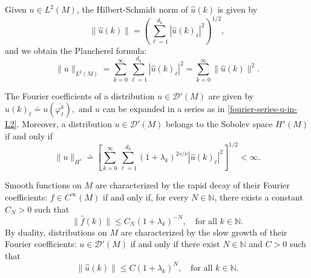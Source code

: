 \documentclass{amsart}
\theoremstyle{definition}
\theoremstyle{remark}
\numberwithin{equation}{section}
\begin{document}
	Given $u \in L^2(M)$, the Hilbert-Schmidt norm of $\widehat{u}(k)$ is given by
	\begin{equation*}
		\|\widehat{u}(k)\|=\left(\sum_{\ell=1}^{d_k}|\widehat{u}(k)_\ell|^2\right)^{1/2},
	\end{equation*}
	and we obtain the Plancherel formula:
	\begin{equation*}
		\|u\|_{L^2(M)}=\sum_{k=0}^{\infty}\sum_{\ell=1}^{d_k}|\widehat{u}(k)_\ell|^2=\sum_{k=0}^{\infty}\|\widehat{u}(k)\|^2.
	\end{equation*}
	
	The Fourier coefficients of a distribution $u \in {\mathscr{D}'}(M)$ are given by $\widehat{u}(k)_\ell \doteq u(\overline{\varphi_\ell^k}),$  
	and $u$ can be expanded in a series as in \eqref{fourier-series-u-in-L2}. Moreover, a distribution $u \in {\mathscr{D}'}(M)$ belongs to the Sobolev space $H^s(M)$ if and only if 
	$$
	\|u\|_{H^s} \doteq \left[\sum_{k=0}^\infty \sum_{\ell=1}^{d_k} (1+\lambda_k)^{2s/ \nu} |\widehat{u}(k)_\ell|^2 \right]^{1/2}< \infty.
	$$ 
	
	Smooth functions on $M$ are characterized by the rapid decay of their Fourier coefficients: $f \in C^\infty(M)$ if and only if, for every $N \in \mathbb{N}$, there exists a constant $C_N > 0$ such that  
	\begin{equation}\label{fourier_coef}
		\|\widehat{f}(k)\| \leq C_N(1+\lambda_k)^{-N}, \quad \text{for all } k \in \mathbb{N}.
	\end{equation}  
	By duality, distributions on $M$ are characterized by the slow growth of their Fourier coefficients: $u \in {\mathscr{D}'}(M)$ if and only if there exist $N \in \mathbb{N}$ and $C > 0$ such that  
	\begin{equation}\label{fourier_coef-distr}
		\|\widehat{u}(k)\| \leq C(1+\lambda_k)^N, \quad \text{for all } k \in \mathbb{N}.
	\end{equation}  
	
\end{document}
